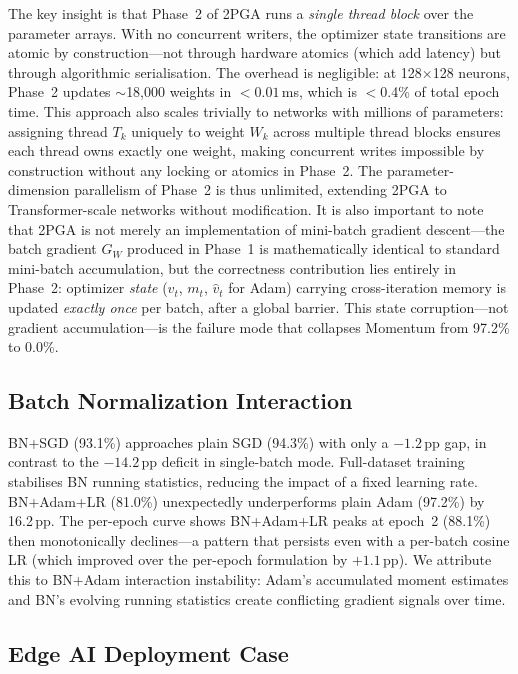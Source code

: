 \documentclass[conference]{IEEEtran}
\begin{document}
The key insight is that Phase~2 of 2PGA runs a \emph{single thread block} over the parameter arrays. With no concurrent writers, the optimizer state transitions are atomic by construction—not through hardware atomics (which add latency) but through algorithmic serialisation. The overhead is negligible: at 128$\times$128 neurons, Phase~2 updates $\sim$18,000 weights in $<0.01$\,ms, which is $<$0.4\% of total epoch time. This approach also scales trivially to networks with millions of parameters: assigning thread $T_k$ uniquely to weight $W_k$ across multiple thread blocks ensures each thread owns exactly one weight, making concurrent writes impossible by construction without any locking or atomics in Phase~2. The parameter-dimension parallelism of Phase~2 is thus unlimited, extending 2PGA to Transformer-scale networks without modification. It is also important to note that 2PGA is not merely an implementation of mini-batch gradient descent—the batch gradient $G_W$ produced in Phase~1 is mathematically identical to standard mini-batch accumulation, but the correctness contribution lies entirely in Phase~2: optimizer \emph{state} ($v_t$, $m_t$, $\hat{v}_t$ for Adam) carrying cross-iteration memory is updated \emph{exactly once} per batch, after a global barrier. This state corruption—not gradient accumulation—is the failure mode that collapses Momentum from 97.2\% to 0.0\%.

\subsection{Batch Normalization Interaction}

BN+SGD (93.1\%) approaches plain SGD (94.3\%) with only a $-1.2$\,pp gap, in contrast to the $-14.2$\,pp deficit in single-batch mode. Full-dataset training stabilises BN running statistics, reducing the impact of a fixed learning rate. BN+Adam+LR (81.0\%) unexpectedly underperforms plain Adam (97.2\%) by 16.2\,pp. The per-epoch curve shows BN+Adam+LR peaks at epoch~2 (88.1\%) then monotonically declines—a pattern that persists even with a per-batch cosine LR (which improved over the per-epoch formulation by $+1.1$\,pp). We attribute this to BN+Adam interaction instability: Adam's accumulated moment estimates and BN's evolving running statistics create conflicting gradient signals over time.

\subsection{Edge AI Deployment Case}
\end{document}
